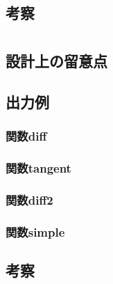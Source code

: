 \documentclass[12pt,a4j,dvipdfmx]{jarticle}
\begin{document}
\subsection{考察}


\newpage
\section{}%
\subsection{設計上の留意点}

\subsection{出力例}
\subsubsection{関数diff}%
\subsubsection{関数tangent}%
\subsubsection{関数diff2}%
\subsubsection{関数simple}%


\subsection{考察}
\end{document}
